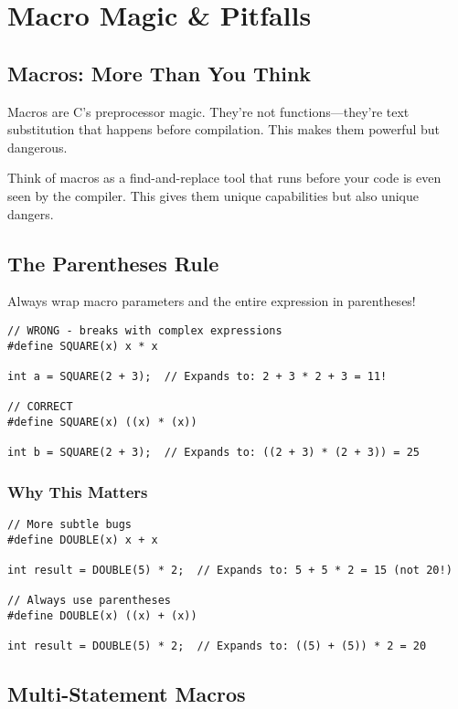\chapter{Macro Magic \& Pitfalls}

\section{Macros: More Than You Think}

Macros are C's preprocessor magic. They're not functions---they're text substitution that happens before compilation. This makes them powerful but dangerous.

Think of macros as a find-and-replace tool that runs before your code is even seen by the compiler. This gives them unique capabilities but also unique dangers.

\section{The Parentheses Rule}

\begin{warningbox}
Always wrap macro parameters and the entire expression in parentheses!
\end{warningbox}

\begin{lstlisting}
// WRONG - breaks with complex expressions
#define SQUARE(x) x * x

int a = SQUARE(2 + 3);  // Expands to: 2 + 3 * 2 + 3 = 11!

// CORRECT
#define SQUARE(x) ((x) * (x))

int b = SQUARE(2 + 3);  // Expands to: ((2 + 3) * (2 + 3)) = 25
\end{lstlisting}

\subsection{Why This Matters}

\begin{lstlisting}
// More subtle bugs
#define DOUBLE(x) x + x

int result = DOUBLE(5) * 2;  // Expands to: 5 + 5 * 2 = 15 (not 20!)

// Always use parentheses
#define DOUBLE(x) ((x) + (x))

int result = DOUBLE(5) * 2;  // Expands to: ((5) + (5)) * 2 = 20
\end{lstlisting}

\section{Multi-Statement Macros}

